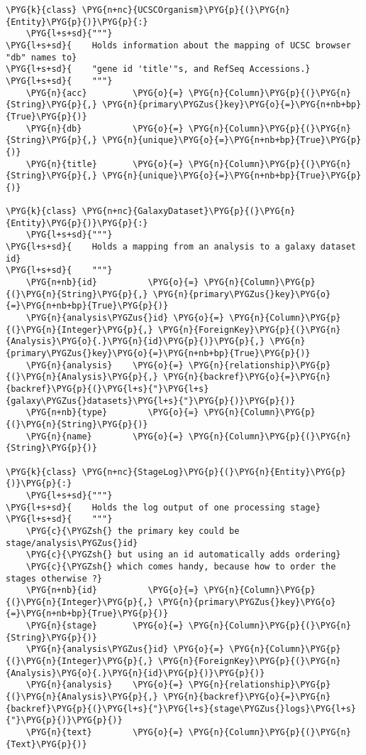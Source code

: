 \begin{Verbatim}[commandchars=\\\{\}]
\PYG{k}{class} \PYG{n+nc}{UCSCOrganism}\PYG{p}{(}\PYG{n}{Entity}\PYG{p}{)}\PYG{p}{:}
    \PYG{l+s+sd}{"""}
\PYG{l+s+sd}{    Holds information about the mapping of UCSC browser "db" names to}
\PYG{l+s+sd}{    "gene id 'title'"s, and RefSeq Accessions.}
\PYG{l+s+sd}{    """}
    \PYG{n}{acc}         \PYG{o}{=} \PYG{n}{Column}\PYG{p}{(}\PYG{n}{String}\PYG{p}{,} \PYG{n}{primary\PYGZus{}key}\PYG{o}{=}\PYG{n+nb+bp}{True}\PYG{p}{)}
    \PYG{n}{db}          \PYG{o}{=} \PYG{n}{Column}\PYG{p}{(}\PYG{n}{String}\PYG{p}{,} \PYG{n}{unique}\PYG{o}{=}\PYG{n+nb+bp}{True}\PYG{p}{)}
    \PYG{n}{title}       \PYG{o}{=} \PYG{n}{Column}\PYG{p}{(}\PYG{n}{String}\PYG{p}{,} \PYG{n}{unique}\PYG{o}{=}\PYG{n+nb+bp}{True}\PYG{p}{)}

\PYG{k}{class} \PYG{n+nc}{GalaxyDataset}\PYG{p}{(}\PYG{n}{Entity}\PYG{p}{)}\PYG{p}{:}
    \PYG{l+s+sd}{"""}
\PYG{l+s+sd}{    Holds a mapping from an analysis to a galaxy dataset id}
\PYG{l+s+sd}{    """}
    \PYG{n+nb}{id}          \PYG{o}{=} \PYG{n}{Column}\PYG{p}{(}\PYG{n}{String}\PYG{p}{,} \PYG{n}{primary\PYGZus{}key}\PYG{o}{=}\PYG{n+nb+bp}{True}\PYG{p}{)}
    \PYG{n}{analysis\PYGZus{}id} \PYG{o}{=} \PYG{n}{Column}\PYG{p}{(}\PYG{n}{Integer}\PYG{p}{,} \PYG{n}{ForeignKey}\PYG{p}{(}\PYG{n}{Analysis}\PYG{o}{.}\PYG{n}{id}\PYG{p}{)}\PYG{p}{,} \PYG{n}{primary\PYGZus{}key}\PYG{o}{=}\PYG{n+nb+bp}{True}\PYG{p}{)}
    \PYG{n}{analysis}    \PYG{o}{=} \PYG{n}{relationship}\PYG{p}{(}\PYG{n}{Analysis}\PYG{p}{,} \PYG{n}{backref}\PYG{o}{=}\PYG{n}{backref}\PYG{p}{(}\PYG{l+s}{"}\PYG{l+s}{galaxy\PYGZus{}datasets}\PYG{l+s}{"}\PYG{p}{)}\PYG{p}{)}
    \PYG{n+nb}{type}        \PYG{o}{=} \PYG{n}{Column}\PYG{p}{(}\PYG{n}{String}\PYG{p}{)}
    \PYG{n}{name}        \PYG{o}{=} \PYG{n}{Column}\PYG{p}{(}\PYG{n}{String}\PYG{p}{)}

\PYG{k}{class} \PYG{n+nc}{StageLog}\PYG{p}{(}\PYG{n}{Entity}\PYG{p}{)}\PYG{p}{:}
    \PYG{l+s+sd}{"""}
\PYG{l+s+sd}{    Holds the log output of one processing stage}
\PYG{l+s+sd}{    """}
    \PYG{c}{\PYGZsh{} the primary key could be stage/analysis\PYGZus{}id}
    \PYG{c}{\PYGZsh{} but using an id automatically adds ordering}
    \PYG{c}{\PYGZsh{} which comes handy, because how to order the stages otherwise ?}
    \PYG{n+nb}{id}          \PYG{o}{=} \PYG{n}{Column}\PYG{p}{(}\PYG{n}{Integer}\PYG{p}{,} \PYG{n}{primary\PYGZus{}key}\PYG{o}{=}\PYG{n+nb+bp}{True}\PYG{p}{)}
    \PYG{n}{stage}       \PYG{o}{=} \PYG{n}{Column}\PYG{p}{(}\PYG{n}{String}\PYG{p}{)}
    \PYG{n}{analysis\PYGZus{}id} \PYG{o}{=} \PYG{n}{Column}\PYG{p}{(}\PYG{n}{Integer}\PYG{p}{,} \PYG{n}{ForeignKey}\PYG{p}{(}\PYG{n}{Analysis}\PYG{o}{.}\PYG{n}{id}\PYG{p}{)}\PYG{p}{)}
    \PYG{n}{analysis}    \PYG{o}{=} \PYG{n}{relationship}\PYG{p}{(}\PYG{n}{Analysis}\PYG{p}{,} \PYG{n}{backref}\PYG{o}{=}\PYG{n}{backref}\PYG{p}{(}\PYG{l+s}{"}\PYG{l+s}{stage\PYGZus{}logs}\PYG{l+s}{"}\PYG{p}{)}\PYG{p}{)}
    \PYG{n}{text}        \PYG{o}{=} \PYG{n}{Column}\PYG{p}{(}\PYG{n}{Text}\PYG{p}{)}
\end{Verbatim}


